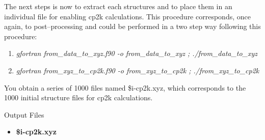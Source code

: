 \documentclass[12pt]{article}
\begin{document}
The next steps is now to extract each structures and to place them in an individual file for enabling cp2k calculations. This procedure corresponds, once again, to post--processing and could be performed in a two step way following this procedure:
\begin{enumerate}
    \item \textit{gfortran from\_data\_to\_xyz.f90 -o from\_data\_to\_xyz ; ./from\_data\_to\_xyz}
    \item \textit{gfortran from\_xyz\_to\_cp2k.f90 -o from\_xyz\_to\_cp2k ; ./from\_xyz\_to\_cp2k}
\end{enumerate}
You obtain a series of 1000 files named \$i-cp2k.xyz, which corresponds to the 1000 initial structure files for cp2k calculations.
\\
\begin{mybox3}{Output Files}
\begin{itemize}
    \item \textbf{\$i-cp2k.xyz}
\end{itemize}
\end{mybox3}
%
\end{document}
